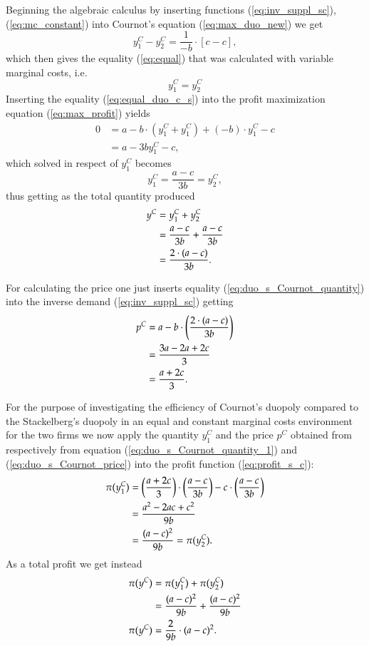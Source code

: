 \documentclass[12pt]{article}
\numberwithin{equation}{subsection}
\begin{document}
Beginning the algebraic calculus by inserting functions (\ref{eq:inv_suppl_sc}), (\ref{eq:mc_constant}) into Cournot's equation (\ref{eq:max_duo_new}) we get \begin{equation*}
y^C_1 - y^C_2 = \frac{1}{-b} \cdot [c - c],
\end{equation*} which then gives the equality (\ref{eq:equal}) that was calculated with variable marginal costs, i.e. \begin{equation}
\label{eq:equal_duo_c_s}
y^C_1 = y^C_2
\end{equation}
Inserting the equality (\ref{eq:equal_duo_c_s}) into the profit maximization equation (\ref{eq:max_profit}) yields \begin{align*}
0 & = a - b \cdot (y^C_1 + y^C_1) + (-b) \cdot y^C_1 - c\\
 & = a - 3by^C_1 - c,
\end{align*}
which solved in respect of $y^C_1$ becomes \begin{equation}
\label{eq:duo_s_Cournot_quantity_1}
y^C_1 = 	\frac{a - c}{3b} = y^C_2,
\end{equation}
thus getting as the total quantity produced \begin{align}
\label{eq:duo_s_Cournot_quantity}
y^C & = y^C_1 + y^C_2\notag \\
& = \frac{a - c}{3b} + \frac{a - c}{3b}\notag \\
& =  \frac{2 \cdot (a - c)}{3b}.
\end{align}

For calculating the price one just inserts equality (\ref{eq:duo_s_Cournot_quantity}) into the inverse demand (\ref{eq:inv_suppl_sc}) getting \begin{align}
\label{eq:duo_s_Cournot_price}
p^C & = a - b \cdot \left(\frac{2 \cdot (a - c)}{3b}\right)\notag \\
& = \frac{3a - 2a + 2c}{3} \notag \\
& = \frac{a + 2c}{3}.
\end{align}

For the purpose of investigating the efficiency of Cournot's duopoly compared to the Stackelberg's duopoly  in an equal and constant marginal costs environment for the two firms we now apply the quantity $y^C_1$ and the price $p^C$ obtained from respectively from equation (\ref{eq:duo_s_Cournot_quantity_1}) and (\ref{eq:duo_s_Cournot_price}) into the profit function (\ref{eq:profit_s_c}): \begin{align}
\label{eq:profit_duo_s_c_1_2}
\pi (y^C_1) & = \left( \frac{a + 2c}{3}\right) \cdot \left(\frac{a - c}{3b} \right) - c \cdot \left( \frac{a - c}{3b}\right)\notag \\
& = \frac{a^2 - 2 ac + c^2}{9b} \notag\\
& = \frac{(a - c)^2}{9b} = \pi (y^C_2).
\end{align}
As a total profit we get instead \begin{align}
\label{eq:profit_courn}
\pi (y^C) & = \pi (y^C_1) + \pi (y^C_2) \notag \\
&= \frac{(a - c)^2}{9b} + \frac{(a - c)^2}{9b} \notag \\
\pi (y^C)& = \frac{2}{9b} \cdot (a - c)^2.
\end{align}
\end{document}
